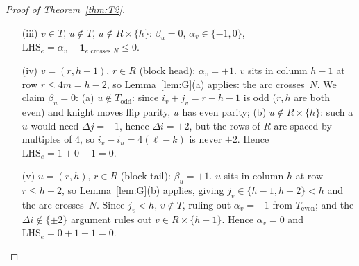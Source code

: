\documentclass[10pt,a4paper]{amsart}
\newcommand{\LHS}{\mathrm{LHS}}
\begin{document}
\begin{proof}[Proof of Theorem~\ref{thm:T2}]
\begin{itemize}
\emph{Sub-case $i_u\le h-2$ (i.e.\ $\alpha\ge 1$).}
The CCW condition $\Delta_j(2\alpha+1)+\Delta_i(2\beta+1)<0$ is
satisfied by $\Delta\in\{(1,-2),(-1,-2),(-2,-1)\}$ (always for
$u\in T$), $(2,-1)$ (when $\alpha\ge 2\beta+1$), and $(-2,1)$
(when $\alpha\le 2\beta$);  the other three steps are never CCW
for $u\in T$.  For $\beta\ge 2$ each of these CCW $\Delta$'s sends
$u$ to a $v$ with $j_v\ge h$, $i_v\le h-1$, and $i_v+j_v\le n-1$
(when $v$ is on the board), so $v\in T$, contradicting case (ii).
The remaining sub-cases are:
\begin{itemize}
\item $\beta=0$ (i.e.\ $j_u=h$):  Lemma~\ref{lem:G}(b) applies, so
the arc crosses~$N$.
\item $\beta=1$ (i.e.\ $j_u=h+1$):  the only CCW arcs with $j_v<h$
are $\Delta\in\{(1,-2),(-1,-2)\}$, both with $j_v=h-1$;  the
crossing of $j=p_j$ at parameter $t^*=3/4$ has height
$i_u\pm 3/4\le h-5/4<p_i$, so the arc crosses~$N$.
\end{itemize}

\emph{Sub-case $i_u=h-1$ (i.e.\ $\alpha=0$).}  Parity then forces
$\beta=0$, so $u=(h-1,h)$.  Of its four CCW knight arcs, the one
with $v\in T$, namely $(h-1,h)\to(h-3,h+1)$, is excluded by the
case~(ii) hypothesis;  the remaining ones lying on the board are
$(h-1,h)\to(h,h-2)$ and $(h-1,h)\to(h-2,h-2)$ (always), plus
$(h-1,h)\to(h-3,h-1)$ for $h\ge 3$.  Their crossing heights at
$j=p_j$ are $h-\tfrac34$, $h-\tfrac54$, $h-2$ respectively, each
strictly below $p_i=h-\tfrac12$, so all three cross~$N$.

In every sub-case $\LHS_e=0+1-1=0$.

\item[(iii)] $v\in T$, $u\notin T$, $u\notin R\times\{h\}$:
$\beta_u=0$, $\alpha_v\in\{-1,0\}$,
$\LHS_e=\alpha_v-\mathbf{1}_{e\text{ crosses }N}\le 0$.

\item[(iv)] $v=(r,h-1)$, $r\in R$ (block head):  $\alpha_v=+1$.
$v$ sits in column $h-1$ at row $r\le 4m=h-2$, so
Lemma~\ref{lem:G}(a) applies:  the arc crosses~$N$.  We claim
$\beta_u=0$:
(a) $u\notin T_{\mathrm{odd}}$: since $i_v+j_v=r+h-1$ is odd
($r,h$ are both even) and knight moves flip parity, $u$ has even
parity;
(b) $u\notin R\times\{h\}$: such a $u$ would need $\Delta j=-1$,
hence $\Delta i=\pm 2$, but the rows of $R$ are spaced by multiples
of $4$, so $i_v-i_u=4(\ell-k)$ is never $\pm 2$.
Hence $\LHS_e=1+0-1=0$.

\item[(v)] $u=(r,h)$, $r\in R$ (block tail):  $\beta_u=+1$.
$u$ sits in column $h$ at row $r\le h-2$, so Lemma~\ref{lem:G}(b)
applies, giving $j_v\in\{h-1,h-2\}<h$ and the arc crosses~$N$.
Since $j_v<h$, $v\notin T$, ruling out $\alpha_v=-1$ from
$T_{\mathrm{even}}$;  and the $\Delta i\notin\{\pm 2\}$ argument
rules out $v\in R\times\{h-1\}$.  Hence $\alpha_v=0$ and
$\LHS_e=0+1-1=0$.


\end{itemize}
\end{proof}
\end{document}
